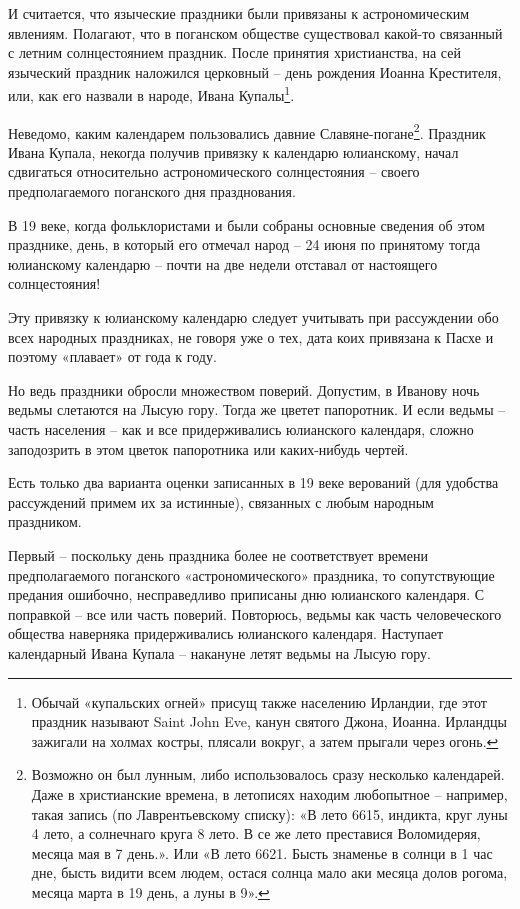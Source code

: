 И считается, что языческие праздники были привязаны к астрономическим явлениям. Полагают, что в поганском обществе существовал какой-то связанный с летним солнцестоянием праздник. После принятия христианства, на сей языческий праздник наложился церковный – день рождения Иоанна Крестителя, или, как его назвали в народе, Ивана Купалы\footnote{Обычай «купальских огней» присущ также населению Ирландии, где этот праздник называют Saint John Eve, канун святого Джона, Иоанна. Ирландцы зажигали на холмах костры, плясали вокруг, а затем прыгали через огонь.}.

Неведомо, каким календарем пользовались давние Славяне-погане\footnote{Возможно он был лунным, либо использовалось сразу несколько календарей. Даже в христианские времена, в летописях находим любопытное – например, такая запись (по Лаврентьевскому списку): «В лето 6615, индикта, круг луны 4 лето, а солнечнаго круга 8 лето. В се же лето преставися Воломидеряя, месяца мая в 7 день.». Или «В лето 6621. Бысть знаменье в солнци в 1 час дне, бысть видити всем людем, остася солнца мало аки месяца долов рогома, месяца марта в 19 день, а луны в 9».}. Праздник Ивана Купала, некогда получив привязку к календарю юлианскому, начал сдвигаться относительно астрономического солнцестояния – своего предполагаемого поганского дня празднования.

В 19 веке, когда фольклористами и были собраны основные сведения об этом празднике, день, в который его отмечал народ – 24 июня по принятому тогда юлианскому календарю – почти на две недели отставал от настоящего солнцестояния!

Эту привязку к юлианскому календарю следует учитывать при рассуждении обо всех народных праздниках, не говоря уже о тех, дата коих привязана к Пасхе и поэтому «плавает» от года к году.

Но ведь праздники обросли множеством поверий. Допустим, в Иванову ночь ведьмы слетаются на Лысую гору. Тогда же цветет папоротник. И если ведьмы – часть населения – как и все придерживались юлианского календаря, сложно заподозрить в этом цветок папоротника или каких-нибудь чертей.

Есть только два варианта оценки записанных в 19 веке верований (для удобства рассуждений примем их за истинные), связанных с любым народным праздником.

Первый – поскольку день праздника более не соответствует времени предполагаемого поганского «астрономического» праздника, то сопутствующие предания ошибочно, несправедливо приписаны дню юлианского календаря. С поправкой – все или часть поверий. Повторюсь, ведьмы как часть человеческого общества наверняка придерживались юлианского календаря. Наступает календарный Ивана Купала – накануне летят ведьмы на Лысую гору.


